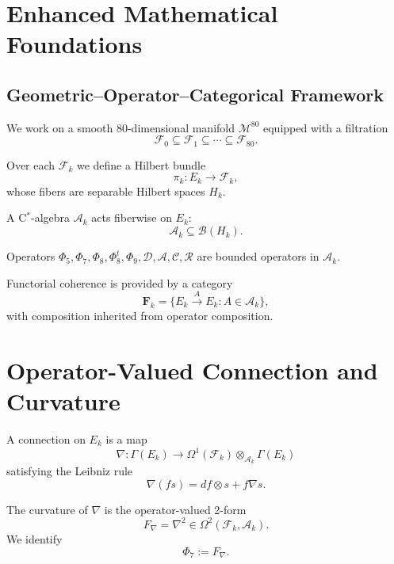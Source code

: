 
\appendix
\section{Enhanced Mathematical Foundations}
\label{sec:EnhancedAppendix}

\subsection{Geometric–Operator–Categorical Framework}

We work on a smooth 80-dimensional manifold $\mathcal{M}^{80}$ equipped with a
filtration
\[
\mathcal{F}_0 \subseteq \mathcal{F}_1 \subseteq \cdots \subseteq \mathcal{F}_{80}.
\]

Over each $\mathcal{F}_k$ we define a Hilbert bundle
\[
\pi_k : E_k \to \mathcal{F}_k,
\]
whose fibers are separable Hilbert spaces $H_k$.

A C$^\ast$-algebra $\mathcal{A}_k$ acts fiberwise on $E_k$:
\[
\mathcal{A}_k \subseteq \mathcal{B}(H_k).
\]

Operators $\Phi_5, \Phi_7, \Phi_8, \Phi_8^t, \Phi_9, \mathcal{D}, \mathcal{A},
\mathcal{C}, \mathcal{R}$ are bounded operators in $\mathcal{A}_k$.

Functorial coherence is provided by a category
\[
\mathbf{F}_k = \{ E_k \xrightarrow{A} E_k : A \in \mathcal{A}_k \},
\]
with composition inherited from operator composition.

\section{Operator-Valued Connection and Curvature}

\begin{definition}
A connection on $E_k$ is a map
\[
\nabla : \Gamma(E_k) \to \Omega^1(\mathcal{F}_k) \otimes_{\mathcal{A}_k} \Gamma(E_k)
\]
satisfying the Leibniz rule
\[
\nabla(f s) = df \otimes s + f \nabla s.
\]
\end{definition}

\begin{definition}
The curvature of $\nabla$ is the operator-valued 2-form
\[
F_\nabla = \nabla^2 \in \Omega^2(\mathcal{F}_k, \mathcal{A}_k).
\]
We identify
\[
\Phi_7 := F_\nabla.
\]
\end{definition}

